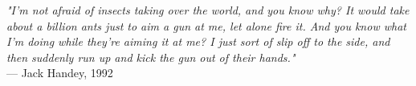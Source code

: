 \begin{flushright}
\emph{"I'm not afraid of insects taking over the world, and you know why? It would take about a billion ants just to aim a gun at me, let alone fire it. And you know what I'm doing while they're aiming it at me? I just sort of slip off to the side, and then suddenly run up and kick the gun out of their hands."}\\
— Jack Handey, 1992
\end{flushright}
